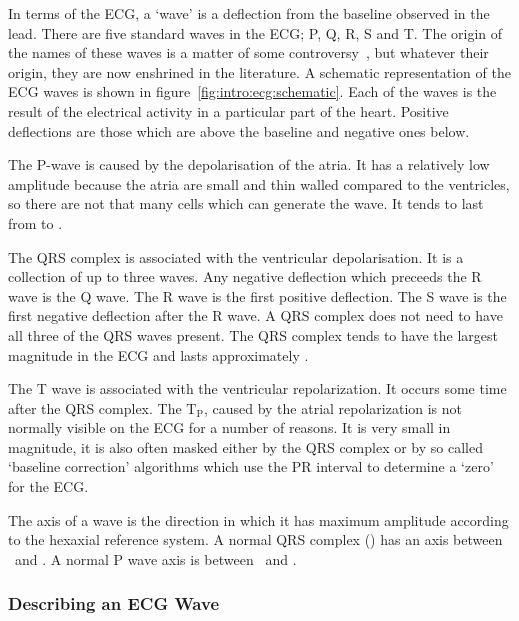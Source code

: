 In terms of the ECG, a `wave' is a deflection from the baseline observed in the
lead.
There are five standard waves in the ECG; P, Q, R, S and T.
The origin of the names of these waves is a matter of some
controversy~\cite{Hurst1998}, but whatever their origin, they are now enshrined
in the literature.
A schematic representation of the ECG waves is shown in
figure~\ref{fig:intro:ecg:schematic}.
Each of the waves is the result of the electrical activity in a particular part
of the heart.
Positive deflections are those which are above the baseline and negative ones
below.

The P-wave is caused by the depolarisation of the atria.
It has a relatively low amplitude because the atria are small and thin walled
compared to the ventricles, so there are not that many cells which can generate
the wave.
It tends to last from  to .

The QRS complex is associated with the ventricular depolarisation.
It is a collection of up to three waves.
Any negative deflection which preceeds the R wave is the Q wave.
The R wave is the first positive deflection.
The S wave is the first negative deflection after the R wave.
A QRS complex does not need to have all three of the QRS waves present.
The QRS complex tends to have the largest magnitude in the ECG and lasts
approximately .

The T wave is associated with the ventricular repolarization.
It occurs some time after the QRS complex.
The $\text{T}_{\text{P}}$, caused by the atrial repolarization is not normally
visible on the ECG for a number of reasons.
It is very small in magnitude, it is also often masked either by the QRS complex
or by so called `baseline correction' algorithms which use the PR interval to
determine a `zero' for the ECG.

The axis of a wave is the direction in which it has maximum amplitude according
to the hexaxial reference system.
A normal QRS complex (\cite{Lipman1994,Katz2006}) has an axis between \
and .
A normal P wave axis is between \ and .

\subsubsection{Describing an ECG Wave}

